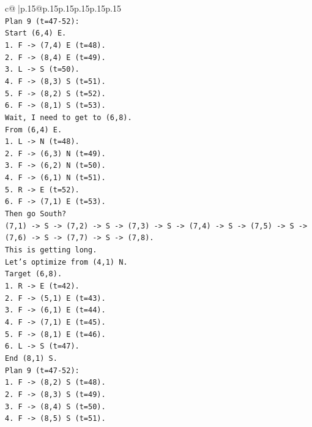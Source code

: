 \documentclass{article}
\begin{document}
{\begin{supertabular}{c@{$\;$}|p{.15\linewidth}@{}p{.15\linewidth}p{.15\linewidth}p{.15\linewidth}p{.15\linewidth}p{.15\linewidth}}
{{{\\ 
\texttt{Plan 9 (t=47{-}52):} \\
\texttt{Start (6,4) E.} \\
\texttt{1. F {-}> (7,4) E (t=48).} \\
\texttt{2. F {-}> (8,4) E (t=49).} \\
\texttt{3. L {-}> S (t=50).} \\
\texttt{4. F {-}> (8,3) S (t=51).} \\
\texttt{5. F {-}> (8,2) S (t=52).} \\
\texttt{6. F {-}> (8,1) S (t=53).} \\
\texttt{Wait, I need to get to (6,8).} \\
\texttt{From (6,4) E.} \\
\texttt{1. L {-}> N (t=48).} \\
\texttt{2. F {-}> (6,3) N (t=49).} \\
\texttt{3. F {-}> (6,2) N (t=50).} \\
\texttt{4. F {-}> (6,1) N (t=51).} \\
\texttt{5. R {-}> E (t=52).} \\
\texttt{6. F {-}> (7,1) E (t=53).} \\
\texttt{Then go South?} \\
\texttt{(7,1) {-}> S {-}> (7,2) {-}> S {-}> (7,3) {-}> S {-}> (7,4) {-}> S {-}> (7,5) {-}> S {-}> (7,6) {-}> S {-}> (7,7) {-}> S {-}> (7,8).} \\
\texttt{This is getting long.} \\
\texttt{Let's optimize from (4,1) N.} \\
\texttt{Target (6,8).} \\
\texttt{1. R {-}> E (t=42).} \\
\texttt{2. F {-}> (5,1) E (t=43).} \\
\texttt{3. F {-}> (6,1) E (t=44).} \\
\texttt{4. F {-}> (7,1) E (t=45).} \\
\texttt{5. F {-}> (8,1) E (t=46).} \\
\texttt{6. L {-}> S (t=47).} \\
\texttt{End (8,1) S.} \\
\texttt{Plan 9 (t=47{-}52):} \\
\texttt{1. F {-}> (8,2) S (t=48).} \\
\texttt{2. F {-}> (8,3) S (t=49).} \\
\texttt{3. F {-}> (8,4) S (t=50).} \\
\texttt{4. F {-}> (8,5) S (t=51).} \\
}}}
\end{supertabular}}
\end{document}
